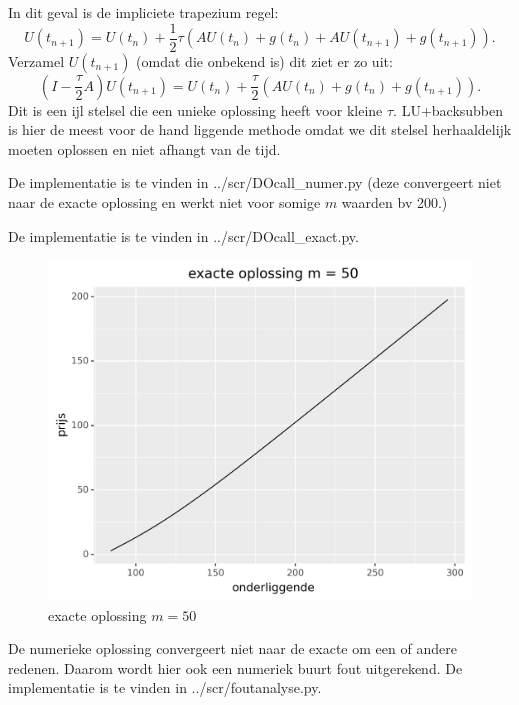 \documentclass{article}
\begin{document}
In dit geval is de impliciete trapezium regel:
\[
  U(t_{n+1}) = U(t_{n}) + \frac{1}{2} \tau (A U(t_{n}) + g(t_{n}) + A U(t_{n+1}) + g(t_{n+1}))
.\]
Verzamel $U(t_{n+1})$ (omdat die onbekend is) dit ziet er zo uit:
\[
  (I-\frac{\tau}{2}A)U(t_{n+1}) = U(t_{n}) + \frac{\tau}{2} (AU(t_{n}) + g(t_{n})+ g(t_{n+1}))
.\]
Dit is een ijl stelsel die een unieke oplossing heeft voor kleine $\tau$.
LU+backsubben is hier de meest voor de hand liggende methode omdat we dit stelsel
herhaaldelijk moeten oplossen en niet afhangt van de tijd.

De implementatie is te vinden in ../scr/DOcall\_numer.py (deze convergeert niet
naar de exacte oplossing en werkt niet voor somige $m$ waarden bv 200.) 

De implementatie is te vinden in ../scr/DOcall\_exact.py.

\begin{figure}
\includegraphics[width=\linewidth]{oefening6.png}
\caption{exacte oplossing $m = 50$ }\label{fig:opl50}
\end{figure}

De numerieke oplossing convergeert niet naar de exacte om een of andere redenen.
Daarom wordt hier ook een numeriek buurt fout uitgerekend.
De implementatie is te vinden in ../scr/foutanalyse.py.

\end{document}
